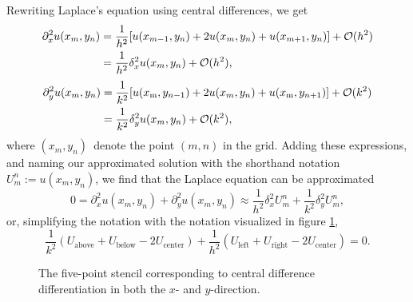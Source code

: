 Rewriting Laplace's equation using central differences, we get
\begin{equation*}
    \begin{split}
    \partial^2_x u(x_m, y_n) 
        &= \frac{1}{h^2}[u(x_{m-1},y_n) + 2u(x_m,y_n) + u(x_{m+1},y_n)] + \mathcal{O}(h^2)\\
        &= \frac{1}{h^2}\delta^2_x u(x_m,y_n) + \mathcal{O}(h^2),\\
    \end{split}
\end{equation*}
\begin{equation*}
    \begin{split}
    \partial^2_y u(x_m, y_n) 
        &= \frac{1}{k^2}[u(x_\text{m},y_{n-1}) + 2u(x_m,y_n) + u(x_\text{m},y_{n+1})] + \mathcal{O}(k^2)\\
        &= \frac{1}{k^2}\delta^2_y u(x_m,y_n) + \mathcal{O}(k^2),\\
    \end{split}
\end{equation*}
where $(x_m, y_n)$ denote the point $(m,n)$ in the grid. 
Adding these expressions, and naming our approximated solution with the shorthand notation $U_m^n := u(x_m,y_n)$, we find that the Laplace equation can be approximated 
\begin{equation*}
    0 = \partial^2_x u(x_m,y_n) + \partial^2_y u(x_m,y_n)
    \approx \frac{1}{h^2}\delta^2_x U_m^n + \frac{1}{k^2}\delta^2_y U_m^n,
\end{equation*}
or, simplifying the notation with the notation visualized in figure \ref{ex3:fig:stencil},
\begin{equation*}
    \frac{1}{k^2}(U_\text{above} + U_\text{below} - 2U_\text{center}) + \frac{1}{h^2}(U_\text{left} + U_\text{right} - 2U_\text{center}) = 0.
\end{equation*}

\begin{figure}[hb]
    \centering
    
    \caption{The five-point stencil corresponding to central difference differentiation in both the $x$- and $y$-direction.}
    \label{ex3:fig:stencil}
\end{figure}

